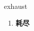 
\begin{frame}
{\huge exhaust}
\begin{center}
\begin{enumerate}\Large
  \item \textbf{耗尽}
\end{enumerate}
\end{center}
\end{frame}
